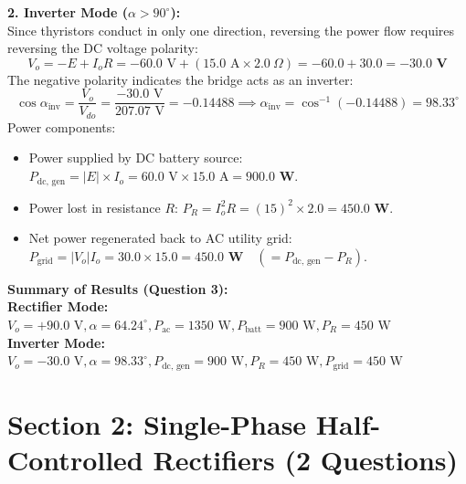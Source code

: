 \documentclass[10pt,a4paper]{article}
\begin{document}
\noindent\textbf{2. Inverter Mode ($\alpha > 90^\circ$):}\\
Since thyristors conduct in only one direction, reversing the power flow requires reversing the DC voltage polarity:
\[
V_o = -E + I_o R = -60.0\text{ V} + (15.0\text{ A} \times 2.0\ \Omega) = -60.0 + 30.0 = \mathbf{-30.0\text{ V}}
\]
The negative polarity indicates the bridge acts as an inverter:
\[
\cos\alpha_{\text{inv}} = \frac{V_o}{V_{do}} = \frac{-30.0\text{ V}}{207.07\text{ V}} = -0.14488 \implies \alpha_{\text{inv}} = \cos^{-1}(-0.14488) = \mathbf{98.33^\circ}
\]
Power components:
\begin{itemize}
  \item Power supplied by DC battery source: $P_{\text{dc, gen}} = |E| \times I_o = 60.0\text{ V} \times 15.0\text{ A} = \mathbf{900.0\text{ W}}$.
  \item Power lost in resistance $R$: $P_R = I_o^2 R = (15)^2 \times 2.0 = \mathbf{450.0\text{ W}}$.
  \item Net power regenerated back to AC utility grid: $P_{\text{grid}} = |V_o| I_o = 30.0 \times 15.0 = \mathbf{450.0\text{ W}} \quad (= P_{\text{dc, gen}} - P_R)$.
\end{itemize}

\begin{tcolorbox}[resbox]
\textbf{\textcolor{accentcyan}{Summary of Results (Question 3):}}\\
\textbf{Rectifier Mode:} $V_o = +90.0\text{ V}, \alpha = 64.24^\circ, P_{\text{ac}} = 1350\text{ W}, P_{\text{batt}} = 900\text{ W}, P_R = 450\text{ W}$\\
\textbf{Inverter Mode:} $V_o = -30.0\text{ V}, \alpha = 98.33^\circ, P_{\text{dc, gen}} = 900\text{ W}, P_R = 450\text{ W}, P_{\text{grid}} = 450\text{ W}$
\end{tcolorbox}

\vspace{5mm}

\section*{Section 2: Single-Phase Half-Controlled Rectifiers (2 Questions)}
\end{document}
